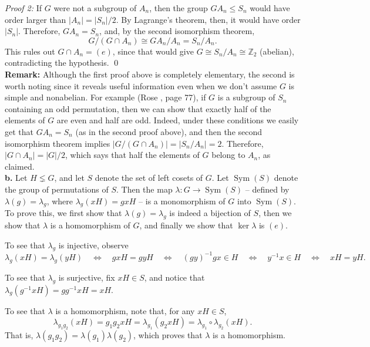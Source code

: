 \documentclass[12pt]{article}
\theoremstyle{plain}
\theoremstyle{definition}
\theoremstyle{remark}
\theoremstyle{remark}
\numberwithin{theorem}{section}
\numberwithin{equation}{section}
\newcommand{\<}{\ensuremath{\langle}}
\renewcommand{\>}{\ensuremath{\rangle}}
\renewcommand{\leq}{\ensuremath{\leqslant}}
\newcommand{\Sym}{\ensuremath{\operatorname{Sym}}}
\newcommand{\Z}{\ensuremath{\mathbb{Z}}}   %
\begin{document}
{\begin{solution}
      {\it Proof 2:} 
      If $G$ were not a subgroup of $A_n$, then the group
      $G A_n\leq S_n$ would have order larger than $|A_n| = |S_n|/2$. 
      By Lagrange's theorem, then, it would have order
      $|S_n|$.  Therefore, $G A_n = S_n$, and, by the 
      second isomorphism theorem,
      \[
      G/(G\cap A_n) \cong G A_n/A_n = S_n/A_n.
      \]
      This rules out $G\cap A_n = (e)$, since that would give $G \cong S_n/A_n
      \cong \Z_2$ (abelian), contradicting the hypothesis.
      \qed
      ~\\
      {\bf Remark:}  Although the first proof above is completely elementary, the second is worth
      noting since it reveals useful information even when we don't assume $G$ is
      simple and nonabelian.  For example (Rose \citeRose, page 77), 
      if $G$ is a subgroup of $S_n$ containing an odd permutation, then we can show that
      exactly half of the elements of $G$ are even and half are odd.  Indeed, under these conditions
      we easily get that $G A_n = S_n$ (as in the second proof above), and then the second isomorphism
      theorem implies $|G/(G\cap A_n)| =|S_n/A_n|=2$. Therefore, $|G\cap A_n| =|G|/2$,
      which says that half the elements of $G$ belong to $A_n$, as claimed. 
      \\[12pt]
      {\bf b.} Let $H\lneq G$, and let $S$ denote the set of left cosets of $G$.  Let
      $\Sym(S)$ denote the group of permutations of $S$.  Then the map $\lambda: G\rightarrow
      \Sym(S)$ -- defined by $\lambda(g) = \lambda_g$, where $\lambda_g(xH) = gxH$ -- is a
      monomorphism of $G$ into $\Sym(S)$.  To prove this, we first show that $\lambda(g) =
      \lambda_g$ is indeed a bijection of $S$, then we show that $\lambda$ is a
      homomorphism of $G$, and finally we show that $\ker \lambda$ is $(e)$.

      To see that $\lambda_g$ is injective, observe
      \[
      \lambda_g(xH) = \lambda_g(yH) 
      \quad \Leftrightarrow \quad 
      gxH = gyH
      \quad \Leftrightarrow \quad 
      (gy)^{-1}gx \in H
      \quad \Leftrightarrow \quad 
      y^{-1}x \in H
      \quad \Leftrightarrow \quad 
      xH = yH.
      \]

      To see that $\lambda_g$ is surjective, fix $xH\in S$, and notice that
      $\lambda_g(g^{-1}xH) = gg^{-1}xH = xH$.

      To see that $\lambda$ is a homomorphism, note that, for any $xH \in S$,
      \[
      \lambda_{g_1 g_2}(xH) = g_1g_2 xH = \lambda_{g_1}(g_2 x H) = 
      \lambda_{g_1}\circ \lambda_{g_2}( x H).
      \]
      That is, $\lambda(g_1 g_2) = \lambda(g_1)\lambda(g_2)$, which proves that $\lambda$
      is a homomorphism.


\end{solution}}
\end{document}
